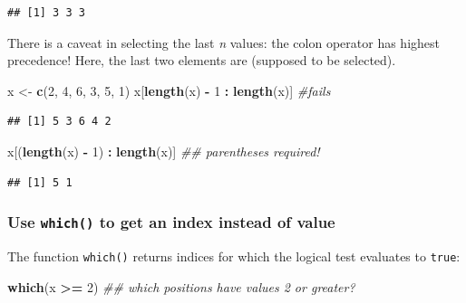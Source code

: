 \documentclass[]{book}
\newenvironment{Shaded}{\begin{snugshade}}{\end{snugshade}}
\newcommand{\CommentTok}[1]{\textcolor[rgb]{0.56,0.35,0.01}{\textit{#1}}}
\newcommand{\DecValTok}[1]{\textcolor[rgb]{0.00,0.00,0.81}{#1}}
\newcommand{\KeywordTok}[1]{\textcolor[rgb]{0.13,0.29,0.53}{\textbf{#1}}}
\newcommand{\NormalTok}[1]{#1}
\newcommand{\OperatorTok}[1]{\textcolor[rgb]{0.81,0.36,0.00}{\textbf{#1}}}
\newcommand{\StringTok}[1]{\textcolor[rgb]{0.31,0.60,0.02}{#1}}
\begin{document}
\begin{verbatim}
## [1] 3 3 3
\end{verbatim}

There is a caveat in selecting the last \emph{n} values: the colon operator has highest precedence!
Here, the last two elements are (supposed to be selected).

\begin{Shaded}
\begin{Highlighting}[]
\NormalTok{x <-}\StringTok{ }\KeywordTok{c}\NormalTok{(}\DecValTok{2}\NormalTok{, }\DecValTok{4}\NormalTok{, }\DecValTok{6}\NormalTok{, }\DecValTok{3}\NormalTok{, }\DecValTok{5}\NormalTok{, }\DecValTok{1}\NormalTok{)}
\NormalTok{x[}\KeywordTok{length}\NormalTok{(x) }\OperatorTok{-}\StringTok{ }\DecValTok{1} \OperatorTok{:}\StringTok{ }\KeywordTok{length}\NormalTok{(x)] }\CommentTok{#fails}
\end{Highlighting}
\end{Shaded}

\begin{verbatim}
## [1] 5 3 6 4 2
\end{verbatim}

\begin{Shaded}
\begin{Highlighting}[]
\NormalTok{x[(}\KeywordTok{length}\NormalTok{(x) }\OperatorTok{-}\StringTok{ }\DecValTok{1}\NormalTok{) }\OperatorTok{:}\StringTok{ }\KeywordTok{length}\NormalTok{(x)] }\CommentTok{## parentheses required!}
\end{Highlighting}
\end{Shaded}

\begin{verbatim}
## [1] 5 1
\end{verbatim}

\hypertarget{use-which-to-get-an-index-instead-of-value}{%
\subsubsection*{\texorpdfstring{Use \texttt{which()} to get an index instead of value}{Use which() to get an index instead of value}}\label{use-which-to-get-an-index-instead-of-value}}

The function \texttt{which()} returns indices for which the logical test evaluates to \texttt{true}:

\begin{Shaded}
\begin{Highlighting}[]
\KeywordTok{which}\NormalTok{(x }\OperatorTok{>=}\StringTok{ }\DecValTok{2}\NormalTok{) }\CommentTok{## which positions have values 2 or greater?}
\end{Highlighting}
\end{Shaded}
\end{document}
